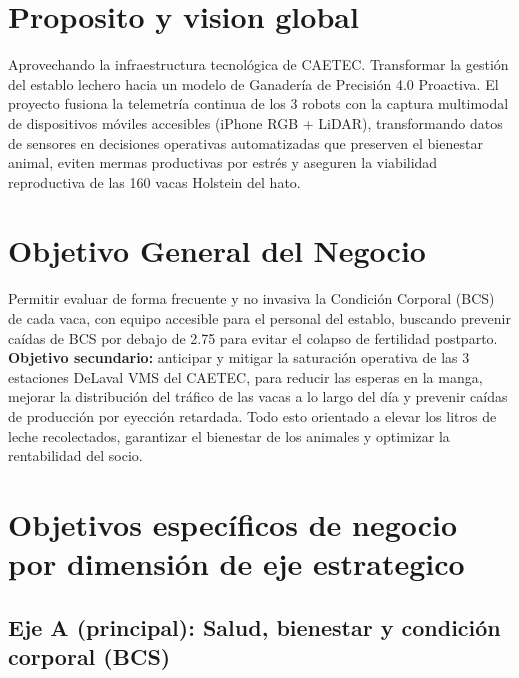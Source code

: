 \documentclass[11pt,letterpaper,DIV=12]{scrartcl}
\begin{document}


\section{Proposito y vision global}

Aprovechando la infraestructura tecnológica de CAETEC. Transformar la gestión del establo lechero hacia un modelo de Ganadería de Precisión 4.0 Proactiva. El proyecto fusiona la telemetría continua de los 3 robots con la captura multimodal de dispositivos móviles accesibles (iPhone RGB + LiDAR), transformando datos de sensores en decisiones operativas automatizadas que preserven el bienestar animal, eviten mermas productivas por estrés y aseguren la viabilidad reproductiva de las 160 vacas Holstein del hato.

\section{Objetivo General del Negocio}

Permitir evaluar de forma frecuente y no invasiva la Condición Corporal (BCS) de cada vaca, con equipo accesible para el personal del establo, buscando prevenir caídas de BCS por debajo de 2.75 para evitar el colapso de fertilidad postparto. \textbf{Objetivo secundario:} anticipar y mitigar la saturación operativa de las 3 estaciones DeLaval VMS del CAETEC, para reducir las esperas en la manga, mejorar la distribución del tráfico de las vacas a lo largo del día y prevenir caídas de producción por eyección retardada. Todo esto orientado a elevar los litros de leche recolectados, garantizar el bienestar de los animales y optimizar la rentabilidad del socio.

\section{Objetivos específicos de negocio por dimensión de eje estrategico}

\subsection{Eje A (principal): Salud, bienestar y condición corporal (BCS)}
\end{document}
